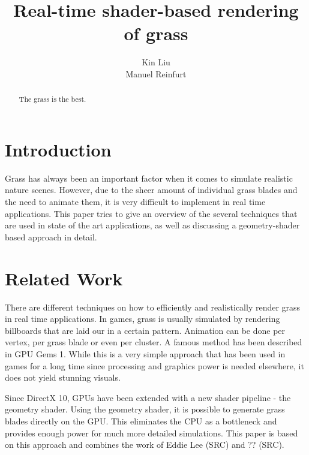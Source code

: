 \documentclass[conference]{acmsiggraph}
\title{Real-time shader-based rendering of grass}
\author {Kin Liu\\Manuel Reinfurt}
\begin{document}

\maketitle

\begin{abstract}

The grass is the best.

\end{abstract}

\TOGlinkslist


\copyrightspace

\section{Introduction}

Grass has always been an important factor when it comes to simulate realistic nature scenes. However, due to the sheer amount of individual grass blades and the need to animate them, it is very difficult to implement in real time applications. This paper tries to give an overview of the several techniques that are used in state of the art applications, as well as discussing a geometry-shader based approach in detail.

\section{Related Work}

There are different techniques on how to efficiently and realistically render grass in real time applications. In games, grass is usually simulated by rendering billboards that are laid our in a certain pattern. Animation can be done per vertex, per grass blade or even per cluster. A famous method has been described in GPU Gems 1. While this is a very simple approach that has been used in games for a long time since processing and graphics power is needed elsewhere, it does not yield stunning visuals.

Since DirectX 10, GPUs have been extended with a new shader pipeline - the geometry shader. Using the geometry shader, it is possible to generate grass blades directly on the GPU. This eliminates the CPU as a bottleneck and provides enough power for much more detailed simulations. This paper is based on this approach and combines the work of Eddie Lee (SRC) and ?? (SRC).
\end{document}

